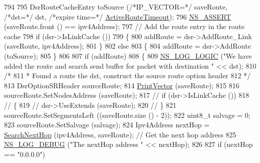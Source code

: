 \begin{DoxyCode}
794 
795                   DsrRouteCacheEntry toSource (\textcolor{comment}{/*IP\_VECTOR=*/} saveRoute, \textcolor{comment}{/*dst=*/} dst, \textcolor{comment}{/*expire time=*/} 
      \hyperlink{classns3_1_1dsr_1_1DsrOptions_a2d111e83b3c91f18ea49478a35ebb119}{ActiveRouteTimeout});
796                   \hyperlink{assert_8h_a6dccdb0de9b252f60088ce281c49d052}{NS\_ASSERT} (saveRoute.front () == ipv4Address);
797                   \textcolor{comment}{// Add the route entry in the route cache}
798                   \textcolor{keywordflow}{if} (dsr->IsLinkCache ())
799                     \{
800                       addRoute = dsr->AddRoute\_Link (saveRoute, ipv4Address);
801                     \}
802                   \textcolor{keywordflow}{else}
803                     \{
804                       addRoute = dsr->AddRoute (toSource);
805                     \}
806 
807                   \textcolor{keywordflow}{if} (addRoute)
808                     \{
809                       \hyperlink{group__logging_ga88acd260151caf2db9c0fc84997f45ce}{NS\_LOG\_LOGIC} (\textcolor{stringliteral}{"We have added the route and search send buffer for packet
       with destination "} << dst);
810                       \textcolor{comment}{/*}
811 \textcolor{comment}{                       * Found a route the dst, construct the source route option header}
812 \textcolor{comment}{                       */}
813                       DsrOptionSRHeader sourceRoute;
814                       \hyperlink{classns3_1_1dsr_1_1DsrOptions_a44ae8e58769880ec9c0150bb28652350}{PrintVector} (saveRoute);
815 
816                       sourceRoute.SetNodesAddress (saveRoute);
817                       \textcolor{comment}{// if (dsr->IsLinkCache ())}
818                       \textcolor{comment}{//   \{}
819                       \textcolor{comment}{//     dsr->UseExtends (saveRoute);}
820                       \textcolor{comment}{//   \}}
821                       sourceRoute.SetSegmentsLeft ((saveRoute.size () - 2));
822                       uint8\_t salvage = 0;
823                       sourceRoute.SetSalvage (salvage);
824                       Ipv4Address nextHop = \hyperlink{classns3_1_1dsr_1_1DsrOptions_a061c66ba810a71ae227371a45cc30cc0}{SearchNextHop} (ipv4Address, saveRoute); \textcolor{comment}{// Get the
       next hop address}
825                       \hyperlink{group__logging_ga413f1886406d49f59a6a0a89b77b4d0a}{NS\_LOG\_DEBUG} (\textcolor{stringliteral}{"The nextHop address "} << nextHop);
826 
827                       \textcolor{keywordflow}{if} (nextHop == \textcolor{stringliteral}{"0.0.0.0"})

\end{DoxyCode}
